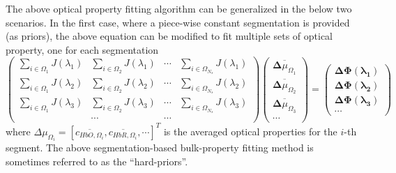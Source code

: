 \documentclass{article}
\begin{document}
The above optical property fitting algorithm can be generalized in the below two scenarios. In the first case, where a piece-wise constant segmentation is provided (as priors), the above equation can be modified to fit multiple sets of optical property, one for each segmentation
\begin{equation}\label{eq:multispectral}
\left(
\begin{array}{llll}
\sum_{i\in\Omega_1}{J}(\lambda_1) & \sum_{i\in\Omega_2}{J}(\lambda_1) & \cdots & \sum_{i\in\Omega_{N_s}}{J}(\lambda_1) \\
\sum_{i\in\Omega_1}{J}(\lambda_2) & \sum_{i\in\Omega_2}{J}(\lambda_2) & \cdots & \sum_{i\in\Omega_{N_s}}{J}(\lambda_2) \\
\sum_{i\in\Omega_1}{J}(\lambda_3) & \sum_{i\in\Omega_2}{J}(\lambda_3) & \cdots & \sum_{i\in\Omega_{N_s}}{J}(\lambda_3) \\
 & \cdots & \cdots 
\end{array}\right)
\left(
\begin{array}{c}
\overline{\boldsymbol{\Delta}{\mu_{\Omega_1}}}\\
\overline{\boldsymbol{\Delta}{\mu_{\Omega_2}}}\\
\overline{\boldsymbol{\Delta}{\mu_{\Omega_3}}}\\
\cdots
\end{array}
\right)=\left(
\begin{array}{c}
\boldsymbol{\Delta\Phi(\lambda_1)}\\
\boldsymbol{\Delta\Phi(\lambda_2)}\\
\boldsymbol{\Delta\Phi(\lambda_3)}\\
\cdots
\end{array}\right)
\end{equation}
where $\Delta\mu_{\Omega_i}=\left[\overline{c_{HbO,\Omega_i}},\overline{c_{HbR,\Omega_i}},\cdots\right]^T$ is the averaged optical properties for the $i$-th segment. The above segmentation-based bulk-property fitting method is sometimes referred to as the ``hard-priors''.
\end{document}
